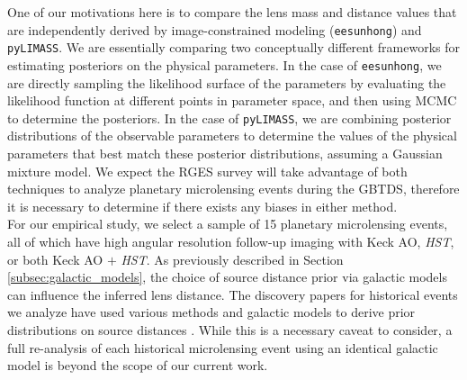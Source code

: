 \documentclass[twocolumn]{aastex631}
\begin{document}
\indent One of our motivations here is to compare the lens mass and distance values that are independently derived by image-constrained modeling (\texttt{eesunhong}) and \texttt{pyLIMASS}. We are essentially comparing two conceptually different frameworks for estimating posteriors on the physical parameters. In the case of \texttt{eesunhong}, we are directly sampling the likelihood surface of the parameters by evaluating the likelihood function at different points in parameter space, and then using MCMC to determine the posteriors. In the case of \texttt{pyLIMASS}, we are combining posterior distributions of the observable parameters to determine the values of the physical parameters that best match these posterior distributions, assuming a Gaussian mixture model. We expect the RGES survey will take advantage of both techniques to analyze planetary microlensing events during the GBTDS, therefore it is necessary to determine if there exists any biases in either method.\\
\indent For our empirical study, we select a sample of 15 planetary microlensing events, all of which have high angular resolution follow-up imaging with Keck AO, \textit{HST}, or both Keck AO $+$ \textit{HST}. As previously described in Section \ref{subsec:galactic_models}, the choice of source distance prior via galactic models can influence the inferred lens distance. The discovery papers for historical events we analyze have used various methods and galactic models to derive prior distributions on source distances \citep{han:2003a, gould:1994a, robin:2003a, dominik:2006a, bennett:2014a, mroz:2020a, koshimoto:2021a}. While this is a necessary caveat to consider, a full re-analysis of each historical microlensing event using an identical galactic model is beyond the scope of our current work. \\
\end{document}
